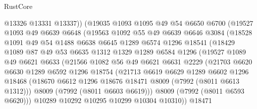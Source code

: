 \begin{lexlean}{RustCore}
\begin{coremodule}
                  @13326
                  @13331
                  @13337))
              (@19035
                @1093
                @1095
                @49
                @54
                @6650
                @6700
                (@19527
                  @1093
                  @49
                  @6639
                  @6648
                  (@19563
                    @1092
                    @55
                    @49
                    @6639
                    @6646
                    @3084
                    (@18528
                      @1091
                      @49
                      @54
                      @1488
                      @6638
                      @6645
                      @1289
                      @6574
                      @1296
                      @18541
                      (@18429
                        @1089
                        @87
                        @49
                        @53
                        @6635
                        @1312
                        @1329
                        @1289
                        @6584
                        @1296
                        (@19527
                          @1089
                          @49
                          @6621
                          @6633
                          (@21566
                            @1082
                            @56
                            @49
                            @6621
                            @6631
                            @2229
                            (@21703
                              @6620
                              @6630
                              @1289
                              @6592
                              @1296
                              @18754
                              (@21713
                                @6619
                                @6629
                                @1289
                                @6602
                                @1296
                                @18468
                                (@18670 @6612 @1296 @18676 @18471 @8009 (@7992 (@8011 @6613 @1312)))
                                @8009
                                (@7992 (@8011 @6603 @6619)))
                              @8009
                              (@7992 (@8011 @6593 @6620)))
                            @10289
                            @10292
                            @10295
                            @10299
                            @10304
                            @10310))
                        @18471

\end{coremodule}
\end{lexlean}
